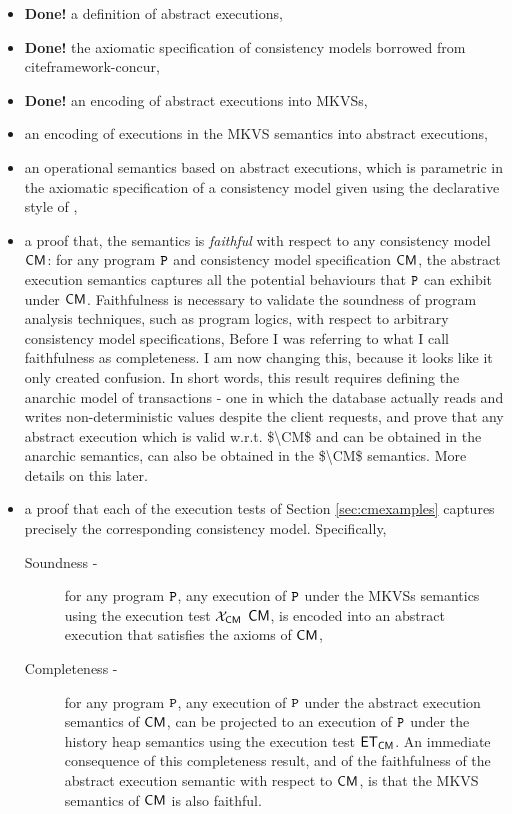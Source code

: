 \begin{itemize}
\item \textbf{Done!} a definition of abstract executions, 
\item \textbf{Done!} the axiomatic specification of consistency models borrowed from cite{framework-concur},
\item \textbf{Done!} an encoding of abstract executions into MKVSs, 
\item an encoding of executions in the MKVS semantics into abstract 
executions, 
\item an operational semantics based on abstract executions, 
which is parametric in the axiomatic specification of a consistency model given using 
the declarative style of \cite{framework-concur,SIanalysis,laws}, 
\item a proof that, the semantics is \emph{faithful} with respect to any consistency model $\CM$: 
for any program $\texttt{P}$ and consistency model specification $\CM$, 
the abstract execution semantics captures all the potential behaviours that $\texttt{P}$ can 
exhibit under $\CM$. Faithfulness is necessary to validate the soundness of 
program analysis techniques, such as program logics, with respect to arbitrary consistency model 
specifications,
\ac{Before I was referring to what I call faithfulness as completeness. I am now changing this, because 
it looks like it only created confusion. In short words, this result requires defining the anarchic model 
of transactions - one in which the database actually reads and writes non-deterministic values 
despite the client requests, and prove that any abstract execution which is 
valid w.r.t. $\CM$ and can be obtained in the anarchic semantics, can also be obtained 
in the $\CM$ semantics. More details on this later.} 
\item a proof that each of the execution tests of Section \ref{sec:cmexamples}
captures precisely the corresponding consistency model. Specifically,
\begin{description}
\item[Soundness - ] for any program $\texttt{P}$, any execution of 
$\texttt{P}$ under the MKVSs semantics using the execution 
test $\mathcal{X}_{\mathsf{CM}}$ $\CM$, is encoded into an abstract execution 
that satisfies the axioms of $\CM$,
\item[Completeness - ] for any program $\texttt{P}$, any 
execution of $\texttt{P}$ under the abstract execution semantics of 
$\CM$, can be projected to an execution of $\texttt{P}$ under the history 
heap semantics using the execution test $\mathsf{ET}_{\mathsf{CM}}$. An immediate 
consequence of this completeness result, and of the faithfulness 
of the abstract execution semantic with respect to $\CM$, is that the MKVS semantics 
of $\CM$ is also faithful.
\end{description}
\end{itemize}

